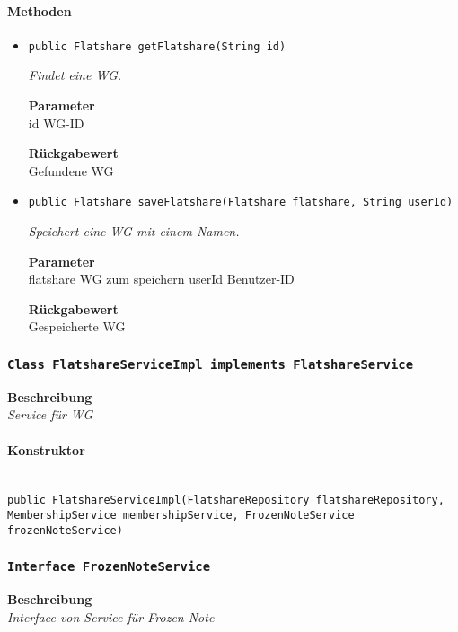     \paragraph*{Methoden}
    \begin{itemize}
    	\item{\texttt{public Flatshare getFlatshare(String id)}}
    	
    	\textit{Findet eine WG.}
    	
    	\textbf{Parameter} \\
    	id WG-ID
    	
    	\textbf{Rückgabewert} \\
    	Gefundene WG        \item{\texttt{public Flatshare saveFlatshare(Flatshare flatshare, String userId)}}
    	
    	\textit{Speichert eine WG mit einem Namen.}
    	
    	\textbf{Parameter} \\
    	flatshare WG zum speichern
    	userId Benutzer-ID
    	
    	\textbf{Rückgabewert} \\
    	Gespeicherte WG
    \end{itemize}
    \subsubsection{\texttt{Class FlatshareServiceImpl implements FlatshareService}}
    \textbf{Beschreibung} \\
    \textit{Service für WG}
    \paragraph*{Konstruktor}\mbox{} \\
    \texttt{public FlatshareServiceImpl(FlatshareRepository flatshareRepository, MembershipService membershipService, FrozenNoteService frozenNoteService)} \\
    \subsubsection{\texttt{Interface FrozenNoteService}}
    \textbf{Beschreibung} \\
    \textit{Interface von Service für Frozen Note}
